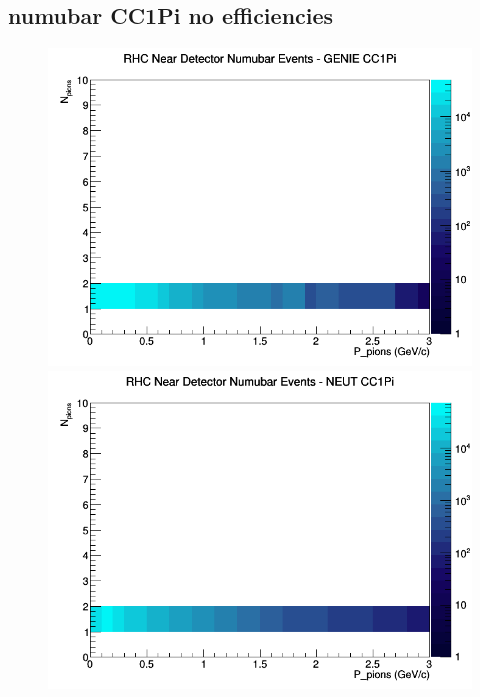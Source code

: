 \documentclass[12pt]{article}
\begin{document}
\subsection{numubar CC1Pi no efficiencies}
\begin{figure}[h]
\includegraphics[width=\linewidth]{N_P/nominal/pions/CC1Pi_RHC_ND_numubar_N_P_GENIE.png}
\endminipage
{}
\includegraphics[width=\linewidth]{N_P/nominal/pions/CC1Pi_RHC_ND_numubar_N_P_NEUT.png}
\endminipage
{}

\end{figure}
\end{document}
